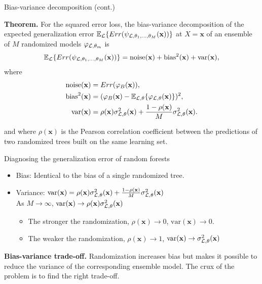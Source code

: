 \documentclass{beamer}
\begin{document}
\begin{frame}{Bias-variance decomposition (cont.)}

{\bf Theorem.}
For the squared error loss, the bias-variance decomposition of the expected
generalization error $\mathbb{E}_{\cal L} \{ Err( \psi_{{\cal L},\theta_1,\dots,\theta_M}(\mathbf{x}))
\}$ at $X=\mathbf{x}$ of an ensemble of $M$ randomized models $\varphi_{{\cal L},\theta_m}$ is
\begin{equation*}
\mathbb{E}_{\cal L} \{ Err(\psi_{{\cal L},\theta_1,\dots,\theta_M}(\mathbf{x})) \} = \text{noise}(\mathbf{x}) + \text{bias}^2(\mathbf{x}) + \text{var}(\mathbf{x}),
\end{equation*}
where
\begin{align*}
\text{noise}(\mathbf{x}) &= Err(\varphi_B(\mathbf{x})), \\
\text{bias}^2(\mathbf{x}) &= (\varphi_B(\mathbf{x}) - \mathbb{E}_{{\cal L},\theta} \{ \varphi_{{\cal L},\theta}(\mathbf{x}) \} )^2, \\
\text{var}(\mathbf{x}) &= \rho(\mathbf{x}) \sigma^2_{{\cal L},\theta}(\mathbf{x}) + \frac{1 - \rho(\mathbf{x})}{M} \sigma^2_{{\cal L},\theta}(\mathbf{x}).
\end{align*}

and where $\rho(\mathbf{x})$ is the Pearson correlation coefficient between
the predictions of two randomized trees built on the same learning set.

\end{frame}


\begin{frame}{Diagnosing the generalization error of random forests}

\begin{itemize}
\item Bias: {\color{blue} Identical} to the bias of a single randomized tree.
\item Variance: $\text{var}(\mathbf{x}) = \rho(\mathbf{x}) \sigma^2_{{\cal L},\theta}(\mathbf{x}) + \frac{1 - \rho(\mathbf{x})}{M} \sigma^2_{{\cal L},\theta}(\mathbf{x})$\\
As $M \to \infty$, {\color{red} $\text{var}(\mathbf{x}) \to \rho(\mathbf{x}) \sigma^2_{{\cal L},\theta}(\mathbf{x})$}
  \begin{itemize}
    \item The stronger the randomization, $\rho(\mathbf{x}) \to 0$, $\text{var}(\mathbf{x}) \to 0$.
    \item The weaker the randomization, $\rho(\mathbf{x}) \to 1$, $\text{var}(\mathbf{x}) \to \sigma^2_{{\cal L},\theta}(\mathbf{x})$
  \end{itemize}
\end{itemize}

\vspace{1cm}

{\bf Bias-variance trade-off.} Randomization increases bias but makes it
possible to reduce the variance of the corresponding ensemble model. The crux
of the problem is to {\color{red} find the right trade-off}.

\end{frame}
\end{document}
